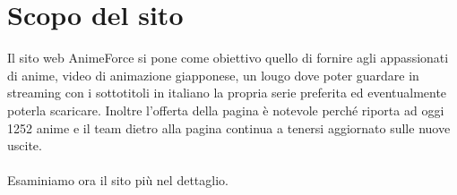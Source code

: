 \section{Scopo del sito}
Il sito web AnimeForce si pone come obiettivo quello di fornire agli appassionati di anime, video di animazione giapponese, un lougo dove poter guardare in streaming con i sottotitoli in italiano la propria serie preferita ed eventualmente poterla scaricare. Inoltre l'offerta della pagina è notevole perché  riporta ad oggi 1252 anime e il team dietro alla pagina continua a tenersi aggiornato sulle nuove uscite.
\\
\\
Esaminiamo ora il sito più nel dettaglio.
